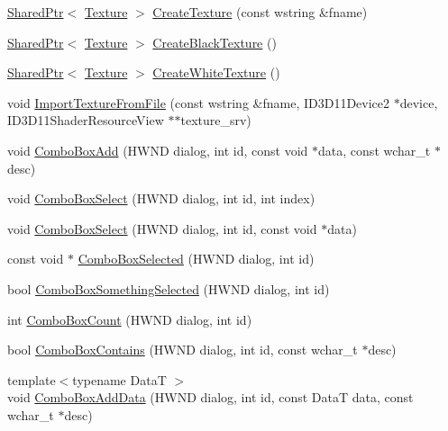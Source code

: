 \begin{DoxyCompactItemize}
\item 
\hyperlink{namespacemage_a1e01ae66713838a7a67d30e44c67703e}{Shared\+Ptr}$<$ \hyperlink{classmage_1_1_texture}{Texture} $>$ \hyperlink{namespacemage_ac27913e621bde0fd01312183aafaaca0}{Create\+Texture} (const wstring \&fname)
\item 
\hyperlink{namespacemage_a1e01ae66713838a7a67d30e44c67703e}{Shared\+Ptr}$<$ \hyperlink{classmage_1_1_texture}{Texture} $>$ \hyperlink{namespacemage_a67c2c82133bfbce0b54db0faee82f79f}{Create\+Black\+Texture} ()
\item 
\hyperlink{namespacemage_a1e01ae66713838a7a67d30e44c67703e}{Shared\+Ptr}$<$ \hyperlink{classmage_1_1_texture}{Texture} $>$ \hyperlink{namespacemage_ac3a2a10cbfc0346662a6fb40dcd0c400}{Create\+White\+Texture} ()
\item 
void \hyperlink{namespacemage_a9bb74ea4a8a931490230fcef651cbd24}{Import\+Texture\+From\+File} (const wstring \&fname, I\+D3\+D11\+Device2 $\ast$device, I\+D3\+D11\+Shader\+Resource\+View $\ast$$\ast$texture\+\_\+srv)
\item 
void \hyperlink{namespacemage_a78e4a1d3c21d6eb8657bfa0a9631d6ee}{Combo\+Box\+Add} (H\+W\+ND dialog, int id, const void $\ast$data, const wchar\+\_\+t $\ast$desc)
\item 
void \hyperlink{namespacemage_aa510d1e5e45102338fce66ae46b2b267}{Combo\+Box\+Select} (H\+W\+ND dialog, int id, int index)
\item 
void \hyperlink{namespacemage_a026dd5ecb1cea93f38193f403e878d23}{Combo\+Box\+Select} (H\+W\+ND dialog, int id, const void $\ast$data)
\item 
const void $\ast$ \hyperlink{namespacemage_affa0d91f266dfbe4ed4a29c26b04dcb8}{Combo\+Box\+Selected} (H\+W\+ND dialog, int id)
\item 
bool \hyperlink{namespacemage_afa2451527062c4213d21bdf01b1922c6}{Combo\+Box\+Something\+Selected} (H\+W\+ND dialog, int id)
\item 
int \hyperlink{namespacemage_a5c586938d7f59a82c8528fab41f17960}{Combo\+Box\+Count} (H\+W\+ND dialog, int id)
\item 
bool \hyperlink{namespacemage_a98228034fca63017765bcdf5966be239}{Combo\+Box\+Contains} (H\+W\+ND dialog, int id, const wchar\+\_\+t $\ast$desc)
\item 
{\footnotesize template$<$typename DataT $>$ }\\void \hyperlink{namespacemage_a0f66abf309f8e527a2f85aa527ea9f3f}{Combo\+Box\+Add\+Data} (H\+W\+ND dialog, int id, const DataT data, const wchar\+\_\+t $\ast$desc)
\item 
$$
\end{DoxyCompactItemize}
